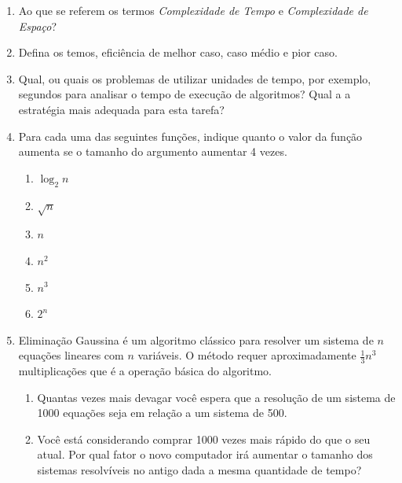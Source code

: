 \documentclass{article}
\begin{document}
\begin{enumerate}
    

    \item Ao que se referem os termos \textit{Complexidade de Tempo} e \textit{Complexidade de Espaço}?
    
    \item Defina os temos, eficiência de melhor caso, caso médio e pior caso.
    
    \item Qual, ou quais os problemas de utilizar unidades de tempo, por exemplo, segundos para analisar o tempo de execução de algoritmos? Qual a a estratégia mais adequada para esta tarefa?
    
    \item Para cada uma das seguintes funções, indique quanto o valor da função aumenta se o tamanho do argumento aumentar 4 vezes.%
    
    \begin{enumerate}
        \item $\log_2n$
        \item $\sqrt{n}$
        \item $n$
        \item $n^2$
        \item $n^3$
        \item $2^n$
    \end{enumerate}
    
    \item Eliminação Gaussina é um algoritmo clássico para resolver um sistema de $n$ equações lineares com $n$ variáveis. O método requer aproximadamente $\frac{1}{3}n^3$ multiplicações que é a operação básica do algoritmo.
    \begin{enumerate}
        \item Quantas vezes mais devagar você espera que a resolução de um sistema de 1000 equações seja em relação a um sistema de 500.
        \item Você está considerando comprar 1000 vezes mais rápido do que o seu atual. Por qual fator o novo computador irá aumentar o tamanho dos sistemas resolvíveis no antigo dada a mesma quantidade de tempo? 
    \end{enumerate}
    

\end{enumerate}
\end{document}
